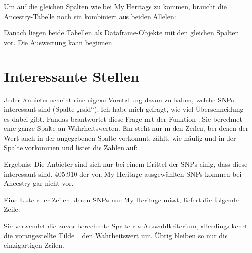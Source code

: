 

\medskip

Um auf die gleichen Spalten wie bei My Heritage zu kommen, braucht die Ancestry-Tabelle noch ein  kombiniert aus beiden Allelen:
	
\medskip


\medskip

Danach liegen beide Tabellen als Dataframe-Objekte mit den gleichen Spalten vor. Die Auswertung kann beginnen.
	
\section{Interessante Stellen}

Jeder Anbieter scheint eine eigene Vorstellung davon zu haben, welche SNPs interessant sind (Spalte „rsid“). Ich habe mich gefragt, wie viel Überschneidung es dabei gibt. Pandas beantwortet diese Frage mit der Funktion . Sie berechnet eine ganze Spalte an Wahrheitswerten. Ein  steht nur in den Zeilen, bei denen der Wert auch in der angegebenen Spalte vorkommt.  zählt, wie häufig  und  in der Spalte vorkommen und listet die Zahlen auf:
	
\medskip


\medskip

Ergebnis: Die Anbieter sind sich nur bei einem Drittel der SNPs einig, dass diese interessant sind. 405.910 der von My ­Heritage ausgewählten SNPs kommen bei Ancestry gar nicht vor.
	
Eine Liste aller Zeilen, deren SNPs nur My Heritage misst, liefert die folgende Zeile:

\medskip


\medskip


Sie verwendet die zuvor berechnete Spalte als Auswahlkriterium, allerdings kehrt die vorangestellte Tilde ~ den Wahrheitswert um. Übrig bleiben so nur die einzigartigen Zeilen.

